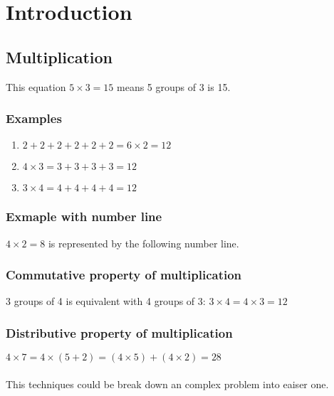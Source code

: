 \documentclass[10pt,a4paper]{article}
\begin{document}
\tableofcontents

\section{Introduction}
\subsection{Multiplication}
This equation $\displaystyle{5 \times 3 = 15}$ means 5 groups of 3 is 15.\\
\subsubsection*{Examples}

\begin{enumerate}
	\item $2 + 2 + 2 + 2 + 2 + 2 = 6 \times 2 = 12$
	\item $4 \times 3 = 3 + 3 + 3 + 3 = 12$
	\item $3 \times 4 = 4 + 4 + 4 + 4 = 12$
\end{enumerate}

\subsubsection*{Exmaple with number line}
$4 \times 2 = 8$ is represented by the following number line.\\


\subsubsection{Commutative property of multiplication}

3 groups of 4 is equivalent with 4 groups of 3: $3 \times 4 = 4 \times 3 = 12$

\subsubsection{Distributive property of multiplication}
$4 \times 7 = 4 \times \left(5 + 2\right) = \left(4 \times 5\right) + \left(4 \times 2\right) = 28$\\\\
This techniques could be break down an complex problem into eaiser one.
\end{document}

